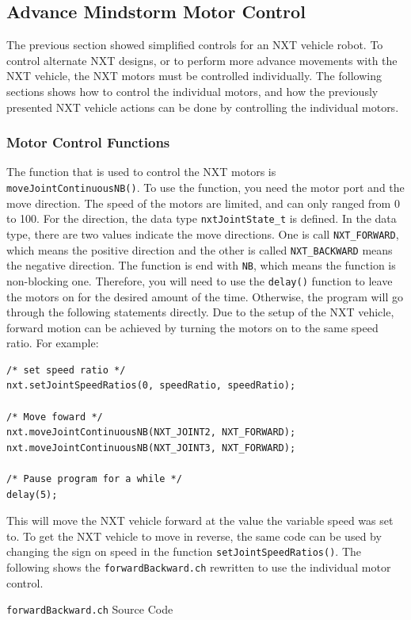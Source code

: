 \documentclass[11pt]{article}
\begin{document}
\subsection{Advance Mindstorm Motor Control}
The previous section showed simplified controls for an NXT vehicle robot. To control 
alternate NXT designs, or to perform more advance movements with the NXT vehicle, the 
NXT motors must be controlled individually. The following sections shows how to control 
the individual motors, and how the previously presented NXT vehicle actions can be done 
by controlling the individual motors.

\subsubsection{Motor Control Functions}
The function that is used to control the NXT motors is \verb+moveJointContinuousNB()+. To use the 
function, you need the motor port and the move direction. The speed of the motors are limited, and 
can only ranged from 0 to 100. For the direction, the data type \texttt{nxtJointState\_t} is defined.
In the data type, there are two values indicate the move directions. One is call \texttt{NXT\_FORWARD},
which means the positive direction and the other is called \texttt{NXT\_BACKWARD} means the negative 
direction. The function is end with \texttt{NB}, which means the function is non-blocking one. Therefore,
you will need to use the \verb+delay()+ function to leave the motors on for the desired amount of the time. 
Otherwise, the program will go through the following statements directly. Due to the setup of the NXT vehicle, 
forward motion can be achieved by turning the motors on to the same speed ratio. For example:
\begin{verbatim}
/* set speed ratio */
nxt.setJointSpeedRatios(0, speedRatio, speedRatio);

/* Move foward */
nxt.moveJointContinuousNB(NXT_JOINT2, NXT_FORWARD);
nxt.moveJointContinuousNB(NXT_JOINT3, NXT_FORWARD);

/* Pause program for a while */
delay(5);
\end{verbatim}
\noindent
This will move the NXT vehicle forward at the value the variable speed was set to. To get the 
NXT vehicle to move in reverse, the same code can be used by changing the sign on speed in the 
function \verb+setJointSpeedRatios()+. The following shows the \verb+forwardBackward.ch+ 
rewritten to use the individual motor control.
\begin{Program}[H]
    {\small}
    \caption{\texttt{forwardBackward.ch} Source Code\label{prog_forwardBackward.ch}}
\end{Program}
\end{document}
